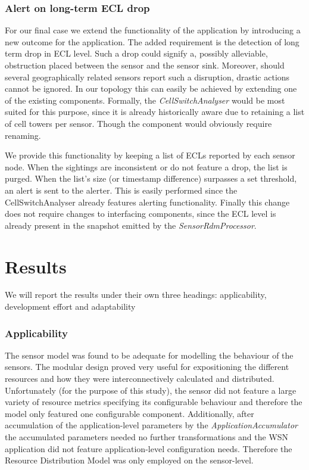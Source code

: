 \subsubsection{Alert on long-term ECL drop}
For our final case we extend the functionality of the application by introducing a new outcome for the application. The added requirement is the detection of long term drop in ECL level. Such a drop could signify a, possibly alleviable, obstruction placed between the sensor and the sensor sink. Moreover, should several geographically related sensors report such a disruption, drastic actions cannot be ignored. In our topology this can easily be achieved by extending one of the existing components. Formally, the \emph{CellSwitchAnalyser} would be most suited for this purpose, since it is already historically aware due to retaining a list of cell towers per sensor. Though the component would obviously require renaming.

We provide this functionality by keeping a list of ECLs reported by each sensor node. When the sightings are inconsistent or do not feature a drop, the list is purged. When the list's size (or timestamp difference) surpasses a set threshold, an alert is sent to the alerter. This is easily performed since the CellSwitchAnalyser already features alerting functionality. Finally this change does not require changes to interfacing components, since the ECL level is already present in the snapshot emitted by the \emph{SensorRdmProcessor}.

\section{Results}
We will report the results under their own three headings: applicability, development effort and adaptability

\subsubsection{Applicability}
The sensor model was found to be adequate for modelling the behaviour of the \sensit sensors. The modular design proved very useful for expositioning the different resources and how they were interconnectively calculated and distributed. Unfortunately (for the purpose of this study), the sensor did not feature a large variety of resource metrics specifying its configurable behaviour and therefore the model only featured one configurable component. Additionally, after accumulation of the application-level parameters by the \emph{ApplicationAccumulator} the accumulated parameters needed no further transformations and the WSN application did not feature application-level configuration needs. Therefore the Resource Distribution Model was only employed on the sensor-level.


